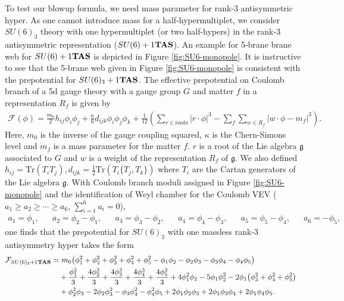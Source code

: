 To test our blowup formula, we need mass parameter for rank-3 antisymmetric hyper. As one cannot introduce mass for a half-hypermultiplet, we consider $SU(6)_3$ theory with one hypermultiplet (or two half-hypers) in the rank-3 antisymmetric representation ($SU(6)+1{\bf TAS}$). An example for 5-brane brane web for $SU(6)+1{\bf TAS}$ is depicted in Figure \ref{fig:SU6-monopole}. It is instructive to see that the 5-brane web given in Figure \ref{fig:SU6-monopole} is consistent with the prepotential for $SU(6)_3+1{\bf TAS}$.  The effective prepotential on Coulomb branch of a 5d gauge theory with a gauge group $G$ and matter $f$ in a representation $R_f$ is given by ~\cite{Intriligator:1997pq}
\begin{align}
\mathcal{F}(\phi) = \frac{m_0}{2}h_{ij}\phi_i\phi_j + \frac{\kappa}{6}d_{ijk}\phi_i\phi_j\phi_k + \frac{1}{12}\left(\sum_{r\in\text{roots}}\left|r\cdot \phi\right|^3 - \sum_f\sum_{w \in R_f}\left|w\cdot \phi - m_f\right|^3\right). \label{prepotential}
\end{align}
Here, $m_0$ is the inverse of the gauge coupling squared, $\kappa$ is the Chern-Simons level and $m_f$ is a mass parameter for the matter $f$. $r$ is a root of the Lie algebra $\mathfrak{g}$ associated to $G$ and $w$ is a weight of the representation $R_f$ of $\mathfrak{g}$. We also defined $h_{ij} = \text{Tr}(T_iT_j), d_{ijk} = \frac{1}{2}\text{Tr}\left(T_i\{T_j, T_k\}\right)$ where $T_i$ are the Cartan generators of the Lie algebra $\mathfrak{g}$. With Coulomb branch moduli assigned in Figure \ref{fig:SU6-monopole} and the identification of Weyl chamber for the Coulomb VEV ($a_1\ge a_2\ge \cdots \ge a_{6}$, $\sum_{i=1}^{6}a_i=0$),
\begin{align}
	a_1= \phi_1,&& 
	a_2=\phi_2-\phi_1,&&
	a_3=\phi_3-\phi_2,&&
	a_4=\phi_4-\phi_3,&&
	a_5=\phi_5-\phi_4,&&
	a_6=-\phi_5, \label{orth2Dynkin}
\end{align}
one finds that the prepotential for $SU(6)_3$ with one massless rank-3 antisymmetry hyper takes the form
\begin{align}
	\mathcal{F}_{SU(6)_3+1{\bf TAS}}=&~m_0 \big( \phi _1^2+\phi _2^2+\phi _3^2+\phi _4^2+\phi _5^2-\phi _1 \phi _2-\phi _2 \phi _3-\phi _3 \phi _4-\phi _4
   \phi _5\big) \cr
   &+ \frac{\phi _1^3}{3}+\frac{4 \phi _2^3}{3}+\frac{4
   \phi _3^3}{3}+\frac{4 \phi_4^3}{3}+\frac{4 \phi_5^3}{3}+4\phi_1^2 \phi_2 -5 \phi_1\phi_2^2 -2\phi_1 \big(\phi_3^2+\phi_4^2+\phi_5^2\big) \cr
  & +\phi_2^2 \phi_3-2 \phi_2 \phi_3^2-\phi_3 \phi_4^2-\phi _4^2 \phi_5+2 \phi _1\phi _2 \phi _3 +2\phi_1\phi_3\phi_4+2\phi_1\phi_4\phi_5. \label{eq:prep+SU6-3}
\end{align}
